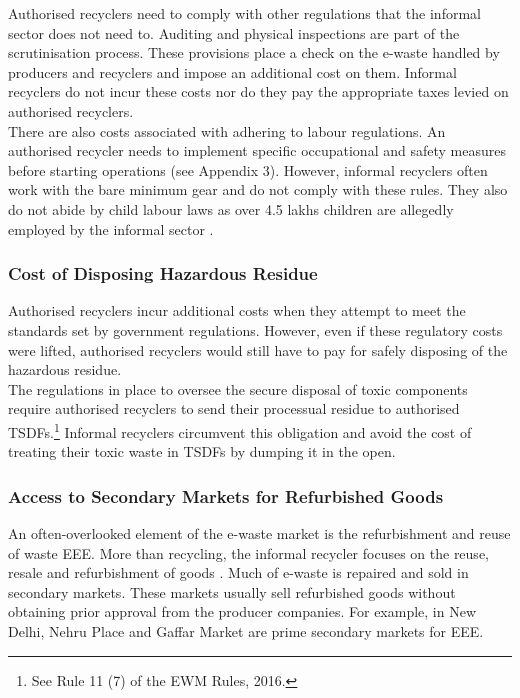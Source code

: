 \documentclass[a4paper, 12pt]{article}
\begin{document}
                    Authorised recyclers need to comply with other regulations that the informal sector does not need to. Auditing and physical inspections are part of the scrutinisation process. These provisions place a check on the e-waste handled by producers and recyclers and impose an additional cost on them. Informal recyclers do not incur these costs nor do they pay the appropriate taxes levied on authorised recyclers. \\
                    
                    There are also costs associated with adhering to labour regulations. An authorised recycler needs to implement specific occupational and safety measures before starting operations (see Appendix 3). However, informal recyclers often work with the bare minimum gear and do not comply with these rules. They also do not abide by child labour laws as over 4.5 lakhs children are allegedly employed by the informal sector \parencite{assochamchild}.
                    
                    \subsubsection{Cost of Disposing Hazardous Residue }
                    
                    Authorised recyclers incur additional costs when they attempt to meet the standards set by government regulations. However, even if these regulatory costs were lifted, authorised recyclers would still have to pay for safely disposing of the hazardous residue.\\
                     
                     The regulations in place to oversee the secure disposal of toxic components require authorised recyclers to send their processual residue to authorised TSDFs.\footnote{See Rule 11 (7) of the EWM Rules, 2016.} Informal recyclers circumvent this obligation and avoid the cost of treating their toxic waste in TSDFs by dumping it in the open.
                    
                    \subsubsection{Access to Secondary Markets for Refurbished Goods}
                    
                    An often-overlooked element of the e-waste market is the refurbishment and reuse of waste EEE. More than recycling, the informal recycler focuses on the reuse, resale and refurbishment of goods \parencite{gidwanicorwinpaper}. Much of e-waste is repaired and sold in secondary markets. These markets usually sell refurbished goods without obtaining prior approval from the producer companies. For example, in New Delhi, Nehru Place and Gaffar Market are prime secondary markets for EEE.\\
                    
\end{document}
